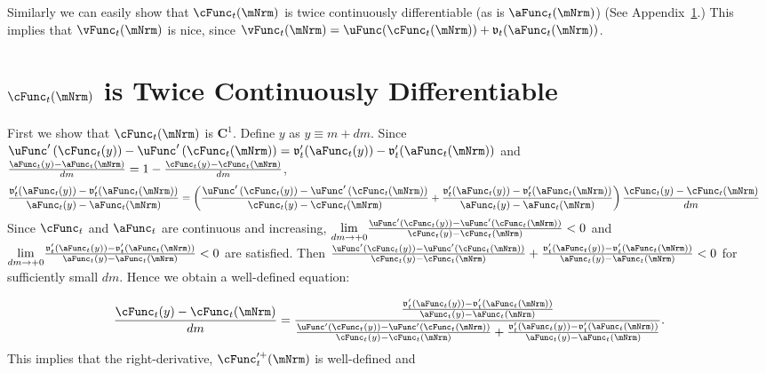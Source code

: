 \documentclass[\econtexRoot/BufferStockTheory]{subfiles}
\begin{document}
Similarly we can easily show that $\cFunc_{t}(\mNrm)$ is twice
continuously differentiable (as is $\aFunc_{t}(\mNrm)$) (See
Appendix~\ref{sec:CIsTwiceDifferentiable}.)  This implies that
$\vFunc_{t}(\mNrm)$ is nice, since
$\vFunc_{t}(\mNrm)=\uFunc(\cFunc_{t}(\mNrm))+\mathfrak{v}_{t}({\aFunc}_{t}(\mNrm))$.

\hypertarget{cFunc-is-Twice-Continuously-Differentiable}{}
\section{
  \texorpdfstring{$\cFunc_{t}(\mNrm)$}{c} is Twice Continuously Differentiable}\label{sec:CIsTwiceDifferentiable}

First we show that $\cFunc_{t}(\mNrm)$ is $\mathbf{C}^{1}$.  Define $y$ as $y\equiv m+dm$.  Since $\uFunc^{\prime }\left( \cFunc_{t}(y)\right) -\uFunc^{\prime }\left(
  \cFunc_{t}(\mNrm)\right) =\mathfrak{v}_{t}^{\prime
}({\aFunc}_{t}(y))-\mathfrak{v}_{t}^{\prime }({\aFunc}_{t}(\mNrm))$ and $
\frac{{\aFunc}_{t}(y)-{\aFunc}_{t}(\mNrm)}{dm}=1-\frac{\cFunc_{t}(y)-\cFunc_{t}(\mNrm)}{dm}$,
\begin{align*}
  \frac{\mathfrak{v}_{t}^{\prime }({\aFunc}_{t}(y))-\mathfrak{v}_{t}^{\prime }({\aFunc}_{t}(\mNrm))}{{\aFunc}_{t}(y)-{\aFunc}_{t}(\mNrm)} %
  & =   
    \left( \frac{\uFunc^{\prime }\left( \cFunc_{t}(y)\right) -\uFunc^{\prime }\left( \cFunc_{t}(\mNrm)\right) }{\cFunc_{t}(y)-\cFunc_{t}(\mNrm)}+\frac{\mathfrak{v}_{t}^{\prime }({\aFunc}_{t}(y))-\mathfrak{v}_{t}^{\prime }({\aFunc}_{t}(\mNrm))}{{\aFunc}_{t}(y)-{\aFunc}_{t}(\mNrm)}\right) \frac{\cFunc_{t}(y)-\cFunc_{t}(\mNrm)}{dm}
\end{align*}
Since $\cFunc_{t}$ and $\aFunc_{t}$ are continuous and increasing, $\underset{
  dm\rightarrow +0}{\lim }\frac{\uFunc^{\prime }\left( \cFunc_{t}(y)\right) -\uFunc^{\prime
  }\left( \cFunc_{t}(\mNrm)\right) }{\cFunc_{t}(y)-\cFunc_{t}(\mNrm)}<0$ and
$\underset{dm\rightarrow+0}{\lim }\frac{\mathfrak{v}_{t}^{\prime }({\aFunc}_{t}(y))-\mathfrak{v}_{t}^{\prime }({\aFunc}_{t}(\mNrm))}{
  {\aFunc}_{t}(y)-{\aFunc}_{t}(\mNrm)}< 0$
are satisfied. Then $\frac{\uFunc^{\prime }\left(
    \cFunc_{t}(y)\right) -\uFunc^{\prime }\left( \cFunc_{t}(\mNrm)\right) }{\cFunc_{t}(y)-\cFunc_{t}(\mNrm)}+
\frac{\mathfrak{v}_{t}^{\prime }({\aFunc}_{t}(y))-\mathfrak{v}_{t}^{\prime }({\aFunc}_{t}(\mNrm))}{{\aFunc}_{t}(y)-{\aFunc}_{t}(\mNrm)}
<0$ for sufficiently small $dm$.
Hence we obtain a well-defined equation:

\begin{equation*}
  \frac{\cFunc_{t}(y)-\cFunc_{t}(\mNrm)}{dm}=\frac{\frac{\mathfrak{v}_{t}^{\prime
      }({\aFunc}_{t}(y))-\mathfrak{v}_{t}^{\prime }({\aFunc}_{t}(\mNrm))}{{\aFunc}_{t}(y)-{\aFunc}_{t}(\mNrm)}}{\frac{\uFunc^{\prime
      }\left( \cFunc_{t}(y)\right) -\uFunc^{\prime }\left( \cFunc_{t}(\mNrm)\right) }{
      \cFunc_{t}(y)-\cFunc_{t}(\mNrm)}+\frac{\mathfrak{v}_{t}^{\prime }({\aFunc}_{t}(y))-\mathfrak{v}_{t}^{\prime }({\aFunc}_{t}(\mNrm))
    }{{\aFunc}_{t}(y)-{\aFunc}_{t}(\mNrm)}}.
\end{equation*}
This implies that the right-derivative, $\cFunc_{t}^{\prime +}(\mNrm)$ is
well-defined and
\end{document}
